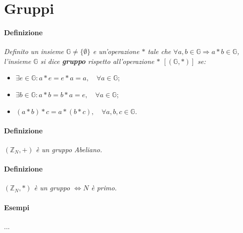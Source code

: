 \documentclass[a4paper]{report}
\begin{document}
\section{Gruppi}
\paragraph{Definizione} \textit{Definito un insieme $\mathbb{G} \neq \{\emptyset\}$ e un'operazione $*$ tale che $\forall a,b \in \mathbb{G}\Rightarrow a*b\in \mathbb{G}$, l'insieme $\mathbb{G}$ si dice \textbf{gruppo} rispetto all'operazione $*$ $[(\mathbb{G},*)]$ se:}
\begin{itemize}
\item $\exists e \in \mathbb{G}: a*e=e*a=a,\quad \forall a \in \mathbb{G}$;
\item $\exists b \in \mathbb{G}: a*b=b*a=e,\quad \forall a \in \mathbb{G}$;
\item $(a*b)*c = a*(b*c), \quad \forall a,b,c \in \mathbb{G}$.
\end{itemize}
\paragraph{Definizione}\textit{$(\mathbb{Z}_N,+)$ è un gruppo Abeliano.}
\paragraph{Definizione}\textit{$(\mathbb{Z}_N,*)$ è un gruppo $\Leftrightarrow N$ è primo. }
\paragraph{Esempi} ...
\end{document}
